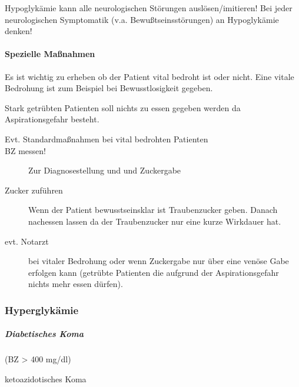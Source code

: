 Hypoglykämie kann alle neurologischen  Störungen
aus\-lösen/imitieren! Bei jeder  neurologischen Symptomatik  (v.a. Bewu{\ss}tseinsstörungen)
an  Hypoglykämie denken!




\begin{gMassnahmenEnv}
    
    \paragraph{Spezielle Maßnahmen}

Es ist wichtig zu erheben ob der Patient vital bedroht ist oder nicht. 
Eine vitale Bedrohung ist zum Beispiel bei Bewusstlosigkeit gegeben.

Stark getrübten Patienten soll nichts zu essen gegeben werden da Aspirationsgefahr besteht. 

\begin{description}
    \item [Evt. Standardmaßnahmen bei vital bedrohten Patienten]
    
    \item [BZ messen!] Zur Diagnosestellung  und und  Zuckergabe
    \item [Zucker zuführen] Wenn der Patient bewusstseinsklar ist Traubenzucker geben. Danach nachessen
    lassen da der Traubenzucker nur eine kurze Wirkdauer hat.
    
    \item [evt. Notarzt] bei vitaler Bedrohung oder wenn Zuckergabe nur über eine venöse Gabe erfolgen kann
    (getrübte Patienten die aufgrund der Aspirationsgefahr
    nichts mehr essen dürfen).
    
\end{description}
\end{gMassnahmenEnv}

\subsubsection{Hyperglykämie}

\subparagraph*{Diabetisches Koma }

{\mdseries
(BZ {\textgreater} 400 mg/dl)}

ketoazidotisches Koma

